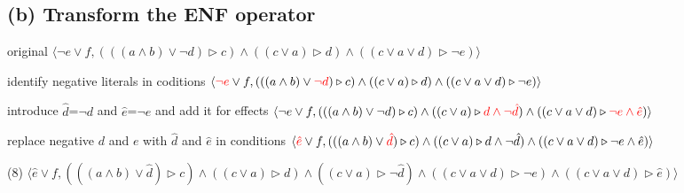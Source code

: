 \documentclass[11pt,a4paper]{article}
\begin{document}
\subsection*{(b) Transform the ENF operator}
original \newline
$ \langle
    \neg e \lor f ,
  (((a \land b) \lor \neg d) \triangleright c)   \land
  ((c \lor a) \triangleright d)  \land
  (( c \lor a \lor d) \triangleright \neg e)
  \rangle
$

identify negative literals in coditions \newline
$ \langle
    \textcolor{red}{\neg e} \lor f ,
  (((a \land b) \lor \textcolor{red}{\neg d}) \triangleright c)   \land
  ((c \lor a) \triangleright d)  \land
  (( c \lor a \lor d) \triangleright \neg e)
  \rangle
$

introduce $\hat{d}$=$\neg d$ and $\hat{e}$=$\neg e$ and add it for effects \newline
$ \langle
    \neg e \lor f ,
  (((a \land b) \lor \neg d) \triangleright c)   \land
  ((c \lor a) \triangleright \textcolor{red}{d \land \neg \hat{d}})  \land
  (( c \lor a \lor d) \triangleright \textcolor{red}{\neg e \land \hat{e}})
  \rangle
$

replace negative $d$ and $e$ with $\hat{d}$ and $\hat{e}$ in conditions \newline
$ \langle
    \textcolor{red}{\hat{e}} \lor f ,
  (((a \land b) \lor \textcolor{red}{\hat{d}}) \triangleright c)   \land
  ((c \lor a) \triangleright d \land \neg \hat{d})  \land
  (( c \lor a \lor d) \triangleright \neg e \land \hat{e})
  \rangle
$

(8) \newline
$ \langle
    \hat{e} \lor f ,
  (((a \land b) \lor \hat{d}) \triangleright c)   \land
  ((c \lor a) \triangleright d)  \land
  ((c \lor a) \triangleright \neg \hat{d})  \land
  (( c \lor a \lor d) \triangleright \neg e) \land
  (( c \lor a \lor d) \triangleright \hat{e})
  \rangle
$
\newpage
\end{document}
